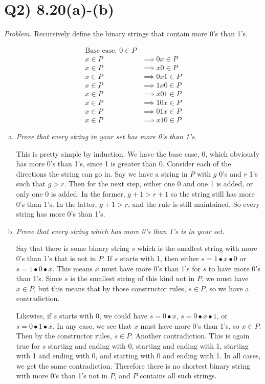 \documentclass{article}
\begin{document}
\section*{Q2) 8.20(a)-(b)}

\textit{Problem.} Recursively define the binary strings that contain more 0's than 1's.

\begin{align*}
  \text{Base case.  } 0 \in P &\\
  x \in P  &\implies 0x \in P \\
  x \in P  &\implies x0 \in P \\
  x \in P  &\implies 0x1 \in P \\
  x \in P  &\implies 1x0 \in P \\
  x \in P &\implies x01 \in P \\
  x \in P &\implies 10x \in P \\
  x \in P &\implies 01x \in P \\
  x \in P &\implies x10 \in P
\end{align*}

\begin{enumerate}[(a)]
  \item \textit{Prove that every string in your set has more 0's than 1's.}

    This is pretty simple by induction. We have the base case, 0, which obviously has more 0's than 1's, since 1 is greater than 0. Consider each of the directions the string can go in. Say we have a string in $P$ with $g$ 0's and $r$ 1's such that $g > r$. Then for the next step, either one 0 and one 1 is added, or only one 0 is added. In the former, $g+1 > r+1$ so the string still has more 0's than 1's. In the latter, $g+1 > r$, and the rule is still maintained. So every string has more 0's than 1's.
  \item \textit{Prove that every string which has more 0's than 1's is in your set.}

    Say that there is some binary string $s$ which is the smallest string with more 0's than 1's that is not in $P$. If $s$ starts with 1, then either $s = 1\bullet x\bullet0$ or $s = 1\bullet0\bullet x$. This means $x$ must have more 0's than 1's for $s$ to have more 0's than 1's. Since $s$ is the smallest string of this kind not in $P$, we must have $x \in P$, but this means that by those constructor rules, $s \in P$, so we have a contradiction.

    Likewise, if $s$ starts with 0, we could have $s = 0 \bullet x$, $s = 0 \bullet x \bullet 1$, or $s = 0 \bullet 1 \bullet x$. In any case, we see that $x$ must have more 0's than 1's, so $x \in P$. Then by the constructor rules, $s \in P$. Another contradiction. This is again true for $s$ starting and ending with 0, starting and ending with 1, starting with 1 and ending with 0, and starting with 0 and ending with 1. In all cases, we get the same contradiction. Therefore there is no shortest binary string with more 0's than 1's not in $P$, and $P$ contains all such strings.
\end{enumerate}
\end{document}
